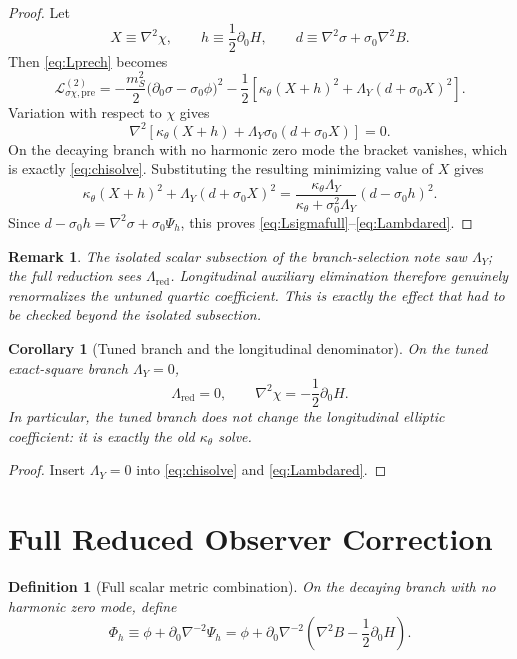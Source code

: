 \documentclass[11pt]{article}
\newtheorem{definition}{Definition}
\newtheorem{remark}{Remark}
\newtheorem{corollary}{Corollary}
\begin{document}
\begin{proof}
Let
\[
X\equiv \nabla^2\chi,
\qquad
h\equiv \frac{1}{2}\partial_0H,
\qquad
d\equiv \nabla^2\sigma+\sigma_0\nabla^2B.
\]
Then \eqref{eq:Lprech} becomes
\[
\mathcal L_{\sigma\chi,\mathrm{pre}}^{(2)}
=
-\frac{m_S^2}{2}\bigl(\partial_0\sigma-\sigma_0\phi\bigr)^2
-\frac{1}{2}
\left[
\kappa_\theta(X+h)^2
+\Lambda_Y(d+\sigma_0X)^2
\right].
\]
Variation with respect to \(\chi\) gives
\[
\nabla^2\!\left[
\kappa_\theta(X+h)+\Lambda_Y\sigma_0(d+\sigma_0X)
\right]=0.
\]
On the decaying branch with no harmonic zero mode the bracket vanishes, which is exactly \eqref{eq:chisolve}. Substituting the resulting minimizing value of \(X\) gives
\[
\kappa_\theta(X+h)^2+\Lambda_Y(d+\sigma_0X)^2
=
\frac{\kappa_\theta\Lambda_Y}
{\kappa_\theta+\sigma_0^2\Lambda_Y}
(d-\sigma_0h)^2.
\]
Since \(d-\sigma_0h=\nabla^2\sigma+\sigma_0\Psi_h\), this proves \eqref{eq:Lsigmafull}--\eqref{eq:Lambdared}.
\end{proof}

\begin{remark}
The isolated scalar subsection of the branch-selection note saw \(\Lambda_Y\); the full reduction sees \(\Lambda_{\mathrm{red}}\). Longitudinal auxiliary elimination therefore genuinely renormalizes the untuned quartic coefficient. This is exactly the effect that had to be checked beyond the isolated subsection.
\end{remark}

\begin{corollary}[Tuned branch and the longitudinal denominator]
\label{cor:tuneddenom}
On the tuned exact-square branch \(\Lambda_Y=0\),
\begin{equation}
\Lambda_{\mathrm{red}}=0,
\qquad
\nabla^2\chi=-\frac{1}{2}\partial_0H.
\label{eq:tunedchi}
\end{equation}
In particular, the tuned branch does not change the longitudinal elliptic coefficient: it is exactly the old \(\kappa_\theta\) solve.
\end{corollary}

\begin{proof}
Insert \(\Lambda_Y=0\) into \eqref{eq:chisolve} and \eqref{eq:Lambdared}.
\end{proof}

\section{Full Reduced Observer Correction}

\begin{definition}[Full scalar metric combination]
\label{def:Phih}
On the decaying branch with no harmonic zero mode, define
\begin{equation}
\Phi_h
\equiv
\phi+\partial_0\nabla^{-2}\Psi_h
=
\phi+\partial_0\nabla^{-2}
\left(\nabla^2B-\frac{1}{2}\partial_0H\right).
\label{eq:Phih}
\end{equation}
\end{definition}
\end{document}
